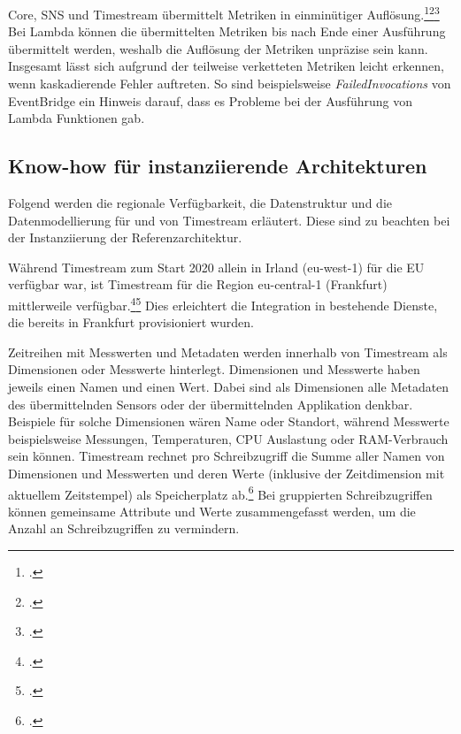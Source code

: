 \AWSIOT{} Core, \ac{SNS} und Timestream übermittelt Metriken in einminütiger Auflösung.\footcite[Vgl.][]{AmazonWebServicesInc..o.J.az}\nzitat\footcite[Vgl.][]{AmazonWebServicesInc..2021b}\nzitat\footcite[Vgl.][]{AmazonWebServicesInc..o.J.be} 
Bei Lambda können die übermittelten Metriken bis nach Ende einer Ausführung übermittelt werden, weshalb die Auflösung der Metriken unpräzise sein kann. Insgesamt lässt sich aufgrund der teilweise verketteten Metriken leicht erkennen, wenn kaskadierende Fehler auftreten. So sind beispielsweise \textit{FailedInvocations} von EventBridge ein Hinweis darauf, dass es Probleme bei der Ausführung von Lambda Funktionen gab.



\subsection{Know-how für instanziierende Architekturen}
Folgend werden die regionale Verfügbarkeit, die Datenstruktur und die Datenmodellierung für und von Timestream erläutert. Diese sind zu beachten bei der Instanziierung der Referenzarchitektur. 

Während Timestream zum Start 2020 allein in Irland (eu-west-1) für die EU verfügbar war, ist Timestream für die Region eu-central-1 (Frankfurt) mittlerweile verfügbar.\footcite[Vgl.][]{AmazonWebServicesInc..2020g}\nzitat\footcite[Vgl.][]{AmazonWebServicesInc..o.J.q} Dies erleichtert die Integration in bestehende Dienste, die bereits in Frankfurt provisioniert wurden.

Zeitreihen mit Messwerten und Metadaten werden innerhalb von Timestream als Dimensionen oder Messwerte hinterlegt. Dimensionen und Messwerte haben jeweils einen Namen und einen Wert. Dabei sind als Dimensionen alle Metadaten des übermittelnden Sensors oder der übermittelnden Applikation denkbar. Beispiele für solche Dimensionen wären Name oder Standort, während Messwerte beispielsweise \coo{} Messungen, Temperaturen, CPU Auslastung oder \ac{RAM}-Verbrauch sein können. Timestream rechnet pro Schreibzugriff die Summe aller Namen von Dimensionen und Messwerten und deren Werte (inklusive der Zeitdimension mit aktuellem Zeitstempel) als Speicherplatz ab.\footcite[Vgl. auch im Folgenden][]{AmazonWebServicesInc..o.J.bs} Bei gruppierten Schreibzugriffen können gemeinsame Attribute und Werte zusammengefasst werden, um die Anzahl an Schreibzugriffen zu vermindern.

